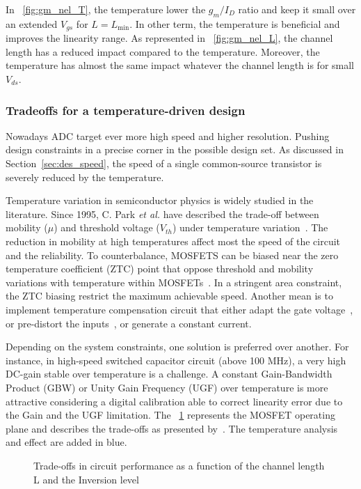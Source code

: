 In \figurename~\ref{fig:gm_nel_T}, the temperature lower the \(g_m/I_D\) ratio and keep it small over an extended \(V_{gs}\) for \(L = L_{\min}\). In other term, the temperature is beneficial and improves the linearity range. As represented in \figurename~\ref{fig:gm_nel_L}, the channel length has a reduced impact compared to the temperature. Moreover, the temperature has almost the same impact whatever the channel length is for small \(V_{ds}\).

\subsubsection{Tradeoffs for a temperature-driven design}
Nowadays ADC target ever more high speed and higher resolution. Pushing design constraints in a precise corner in the possible design set. As discussed in Section~\ref{sec:des_speed}, the speed of a single common-source transistor is severely reduced by the temperature. 

Temperature variation in semiconductor physics is widely studied in the literature. Since 1995, C. Park \textit{et al.} have described the trade-off between mobility (\(\mu \)) and threshold voltage (\(V_{th} \)) under temperature variation~\cite{Park1995}. The reduction in mobility at high temperatures affect most the speed of the circuit and the reliability. To counterbalance, MOSFETS can be biased near the zero temperature coefficient (ZTC) point that oppose threshold and mobility variations with temperature within MOSFETs~\cite{Shoucair1986,Filanovsky2001}. In a stringent area constraint, the ZTC biasing restrict the maximum achievable speed. Another mean is to implement temperature compensation circuit that either adapt the gate voltage~\cite{Chen2011, Gomez2010}, or pre-distort the inputs~\cite{Sira2013}, or generate a constant current.

Depending on the system constraints, one solution is preferred over another. For instance, in high-speed switched capacitor circuit (above 100 MHz), a very high DC-gain stable over temperature is a challenge. A constant Gain-Bandwidth Product (GBW) or Unity Gain Frequency (UGF) over temperature is more attractive considering a digital calibration able to correct linearity error due to the Gain and the UGF limitation. The \figurename~\ref{fig:tradeoffs} represents the MOSFET operating plane and describes the trade-offs as presented by~\cite{Binkley2003}. The temperature analysis and effect are added in blue.
\begin{figure}[!ht]
	\centering
	
	\caption{Trade-offs in circuit performance as a function of the channel length L and the Inversion level}
	\label{fig:tradeoffs}
\end{figure}

